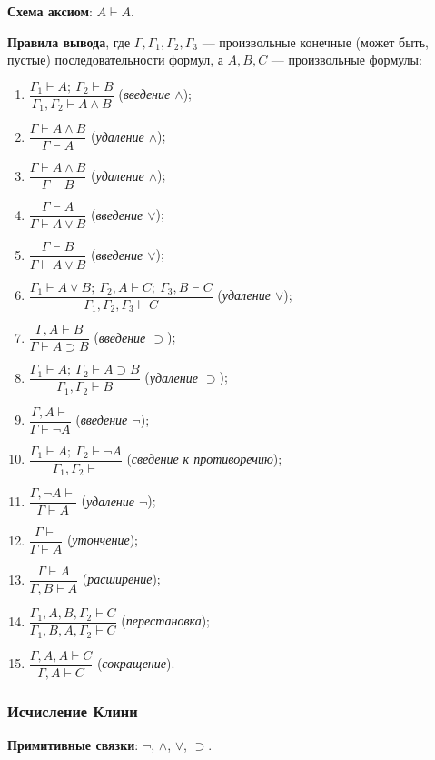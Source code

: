 \textbf{Схема аксиом}: $A \vdash A$.

\textbf{Правила вывода}, где $\Gamma, \Gamma_1, \Gamma_2, \Gamma_3$ --- произвольные конечные (может быть, пустые) последовательности формул, а $A, B, C$ --- произвольные формулы:
\begin{enumerate}[label=\arabic*)]
    \item $\dfrac{\Gamma_1 \vdash A;\ \Gamma_2 \vdash B}{\Gamma_1, \Gamma_2 \vdash A \land B}$ (\textit{введение $\land$});
    \item $\dfrac{\Gamma \vdash A \land B}{\Gamma \vdash A}$ (\textit{удаление $\land$});
    \item $\dfrac{\Gamma \vdash A \land B}{\Gamma \vdash B}$ (\textit{удаление $\land$});
    \item $\dfrac{\Gamma \vdash A}{\Gamma \vdash A \lor B}$ (\textit{введение $\lor$});
    \item $\dfrac{\Gamma \vdash B}{\Gamma \vdash A \lor B}$ (\textit{введение $\lor$});
    \item $\dfrac{\Gamma_1 \vdash A \lor B;\ \Gamma_2, A \vdash C;\ \Gamma_3, B \vdash C}{\Gamma_1, \Gamma_2, \Gamma_3 \vdash C}$ (\textit{удаление $\lor$});
    \item $\dfrac{\Gamma, A \vdash B}{\Gamma \vdash A \supset B}$ (\textit{введение $\supset$});
    \item $\dfrac{\Gamma_1 \vdash A;\ \Gamma_2 \vdash A \supset B}{\Gamma_1, \Gamma_2 \vdash B}$ (\textit{удаление $\supset$});
    \item $\dfrac{\Gamma, A \vdash}{\Gamma \vdash \neg A}$ (\textit{введение $\neg$});
    \item $\dfrac{\Gamma_1 \vdash A;\ \Gamma_2 \vdash \neg A}{\Gamma_1, \Gamma_2 \vdash}$ (\textit{сведение к противоречию});
    \item $\dfrac{\Gamma, \neg A \vdash}{\Gamma \vdash A}$ (\textit{удаление $\neg$});
    \item $\dfrac{\Gamma \vdash}{\Gamma \vdash A}$ (\textit{утончение});
    \item $\dfrac{\Gamma \vdash A}{\Gamma, B \vdash A}$ (\textit{расширение});
    \item $\dfrac{\Gamma_1, A, B, \Gamma_2 \vdash C}{\Gamma_1, B, A, \Gamma_2 \vdash C}$ (\textit{перестановка});
    \item $\dfrac{\Gamma, A, A \vdash C}{\Gamma, A \vdash C}$ (\textit{сокращение}).
\end{enumerate}

\subsubsection{Исчисление Клини}
\textbf{Примитивные связки}: $\neg$, $\land$, $\lor$, $\supset$.

